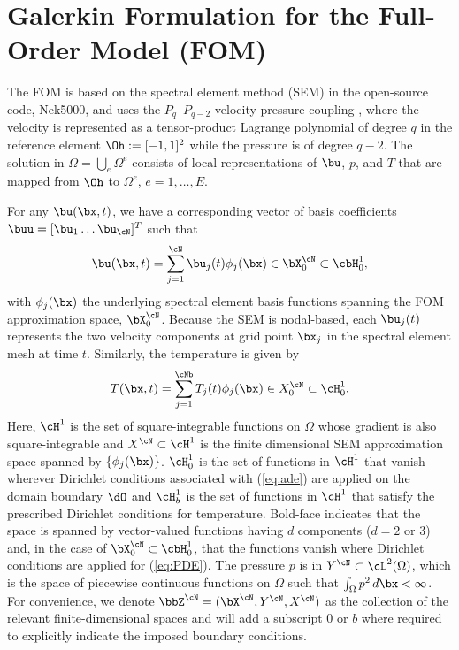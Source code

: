 \section{Galerkin Formulation for the Full-Order Model (FOM)} \label{galerkin_fom}
\noindent The FOM is based on the spectral element method (SEM) in the
open-source code, Nek5000, and uses the $P_{q}$--$P_{q-2}$ velocity-pressure
coupling \cite{maday1987well}, where the velocity is represented as a
tensor-product Lagrange polynomial of degree $q$ in the reference element $\Oh
:= [-1,1]^2$ while the pressure is of degree $q-2$.  The solution in $\Omega =
\bigcup_e \Omega^e$ consists of local representations of $\bu$, $p$, and $T$
that are mapped from $\Oh$ to $\Omega^e$, $e=1,\dots,E$. 

For any $\bu(\bx,t)$, we have a corresponding vector of basis coefficients
$\buu = [\bu_1\dots \bu_{\cN}]^T$ such that 
%
\begin{equation} \label{eq:ui} 
   \bu(\bx,t) = \sum_{j=1}^\cN \bu_j(t) \phi_j(\bx) \in \bX_0^\cN \subset
   \cbH^1_0,
\end{equation}
%
with $\phi_j(\bx)$ the underlying spectral element basis functions spanning the
FOM approximation space, $\bX_0^\cN$.  Because the SEM is nodal-based, each
$\bu_j(t)$ represents the two velocity components at grid point $\bx_j$ in the
spectral element mesh at time $t$.  Similarly, the temperature is given by
%
\begin{equation} \label{eq:ti}
    T(\bx,t) = \sum_{j=1}^\cNb T_j(t) \phi_j(\bx) \in X^{\cN}_0 \subset \cH^1_0.
\end{equation}  Here, $\cH^1$ is the set of square-integrable
%
functions on $\Omega$ whose gradient is also square-integrable and $X^{\cN}
\subset \cH^1$ is the finite dimensional SEM approximation space spanned by $\{
   \phi_j(\bx) \}$. $\cH^1_0$ is the set of functions in $\cH^1$ that vanish
wherever Dirichlet conditions associated with (\ref{eq:ade}) are applied on the
domain boundary $\dO$ and $\cH^1_b$ is the set of functions in $\cH^1$ that
satisfy the prescribed Dirichlet conditions for temperature.  Bold-face
indicates that the space is spanned by vector-valued functions having $d$
components ($d=2$ or $3$) and, in the case of $\bX_0^{\cN} \subset \cbH^1_0$,
that the functions vanish where Dirichlet conditions are applied for
(\ref{eq:PDE}).  The pressure $p$ is in $Y^{\cN} \subset \cL^2(\Omega)$, which
is the space of piecewise continuous functions on $\Omega$ such that
$\int_{\Omega} p^2 \, d\bx < \infty$.  For convenience, we denote $\bbZ^{\cN} =
(\bX^{\cN},Y^{\cN},X^{\cN})$ as the collection of the relevant
finite-dimensional spaces and will add a subscript $0$ or $b$ where required to
explicitly indicate the imposed boundary conditions.

